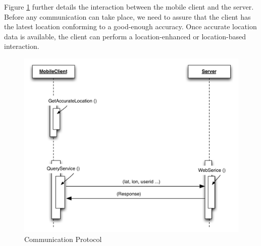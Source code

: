 \noindent Figure \ref{fig.design.comm_protocol} further details the interaction between the mobile client and the server. Before any communication can take place, we need to assure that the client has the latest location conforming to a good-enough accuracy. Once accurate location data is available, the client can perform a location-enhanced or location-based interaction.
\begin{figure}[H]
	\centering
	\includegraphics[width=1.0\linewidth]{fig/abstract_communication_protocol}
	\caption{Communication Protocol}
	\label{fig.design.comm_protocol}
\end{figure}
